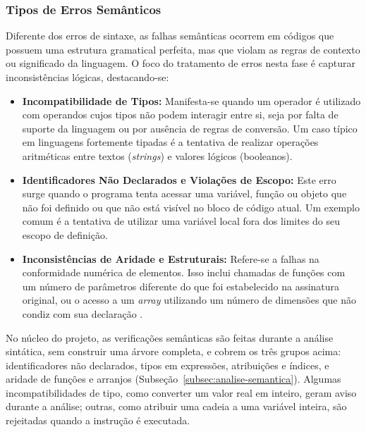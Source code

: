\subsubsection*{Tipos de Erros Semânticos}

Diferente dos erros de sintaxe, as falhas semânticas ocorrem em códigos que possuem uma estrutura gramatical perfeita, mas que violam as regras de contexto ou significado da linguagem. O foco do tratamento de erros nesta fase é capturar inconsistências lógicas, destacando-se:

\begin{itemize}
    \item \textbf{Incompatibilidade de Tipos:} Manifesta-se quando um operador é utilizado com operandos cujos tipos não podem interagir entre si, seja por falta de suporte da linguagem ou por ausência de regras de conversão. Um caso típico em linguagens fortemente tipadas é a tentativa de realizar operações aritméticas entre textos (\textit{strings}) e valores lógicos (booleanos).
    
    \item \textbf{Identificadores Não Declarados e Violações de Escopo:} Este erro surge quando o programa tenta acessar uma variável, função ou objeto que não foi definido ou que não está visível no bloco de código atual. Um exemplo comum é a tentativa de utilizar uma variável local fora dos limites do seu escopo de definição.
    
    \item \textbf{Inconsistências de Aridade e Estruturais:} Refere-se a falhas na conformidade numérica de elementos. Isso inclui chamadas de funções com um número de parâmetros diferente do que foi estabelecido na assinatura original, ou o acesso a um \textit{array} utilizando um número de dimensões que não condiz com sua declaração \cite{aho1995}.
\end{itemize}

No núcleo do projeto, as verificações semânticas são feitas durante a análise sintática, sem construir uma árvore completa, e cobrem os três grupos acima: identificadores não declarados, tipos em expressões, atribuições e índices, e aridade de funções e arranjos (Subseção~\ref{subsec:analise-semantica}). Algumas incompatibilidades de tipo, como converter um valor real em inteiro, geram aviso durante a análise; outras, como atribuir uma cadeia a uma variável inteira, são rejeitadas quando a instrução é executada.

